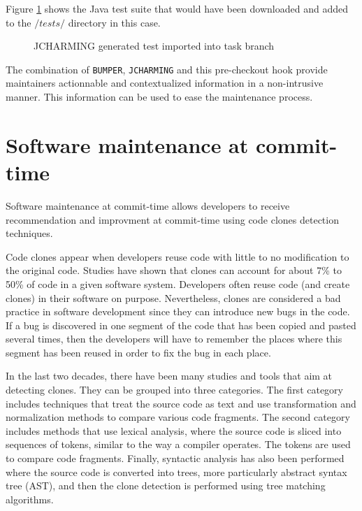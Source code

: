 Figure \ref{fig:jcharming-imported} shows the Java test suite that would have been downloaded and added to the $/tests/$ directory in this case.

\begin{figure}
  
  \caption{JCHARMING generated test imported into task branch
  \label{fig:jcharming-imported}}
\end{figure}

The combination of {\tt BUMPER}, {\tt JCHARMING} and this pre-checkout hook provide maintainers actionnable and contextualized information in a non-intrusive manner.
This information can be used to ease the maintenance process.

\section{Software maintenance at commit-time}

Software maintenance at commit-time allows developers to receive recommendation and improvment at commit-time using code clones detection techniques.

Code clones appear when developers reuse code with little to no modification to the original code.
Studies have shown  that clones can account for about 7\% to 50\% of code in a given software system\cite{Baker, StephaneDucasse}.
Developers often reuse code (and create clones) in their software on purpose\cite{Kim2005}.
Nevertheless, clones are considered a bad practice in software development since they can introduce new bugs in the code\cite{Kapser2006,Juergens2009,Li2006}.
If a  bug is discovered in one segment of the code that has been copied and pasted several times, then the developers will have to remember the places where this segment has been reused in order to fix the bug in each place.

In the last two decades, there have been many studies and tools that aim at detecting clones. They can be grouped into three categories.
The first category includes techniques that treat the source code as text and use transformation and normalization methods to compare various code fragments\cite{Johnson1994,Johnson1993, Cordy2011, Roy2008}.
The second category includes methods that
use lexical analysis, where the source code is sliced into sequences of tokens, similar to the way a compiler operates\cite{Baker,Bakera,Baker2002,Kamiya2002,Li2006}.
The tokens are used to compare code fragments.
Finally, syntactic analysis has also been performed where the source code is converted into trees, more particularly abstract syntax tree (AST), and then the clone detection is performed using tree matching algorithms\cite{Baxter1998, Komondoor2000, Tairas2006, Falke2008}.


